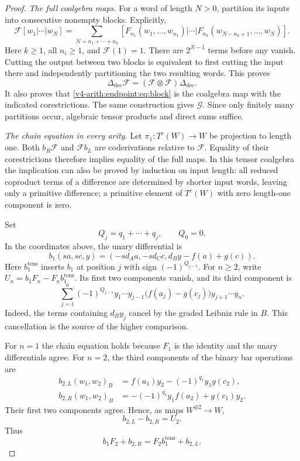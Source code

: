 \begin{proof}
\emph{The full coalgebra maps.}
For a word of length $N>0$, partition its inputs into consecutive nonempty blocks. Explicitly,
\begin{equation}\label{v4-arith:endpoint:eq:block}
 \mathcal{F}[w_1|\cdots|w_N]
 =\sum_{N=n_1+\cdots+n_k}
 [F_{n_1}(w_1,\ldots,w_{n_1})|\cdots|
 F_{n_k}(w_{N-n_k+1},\ldots,w_N)].
\end{equation}
Here $k\geq1$, all $n_i\geq1$, and $\mathcal{F}(1)=1$. There are $2^{N-1}$ terms before any vanish. Cutting the output between two blocks is equivalent to first cutting the input there and independently partitioning the two resulting words. This proves
\[
 \Delta_{\mathrm{dec}}\mathcal{F}=(\mathcal{F}\otimes\mathcal{F})\Delta_{\mathrm{dec}}.
\]
It also proves that \eqref{v4-arith:endpoint:eq:block} is the coalgebra map with the indicated corestrictions. The same construction gives $\mathcal{G}$. Since only finitely many partitions occur, algebraic tensor products and direct sums suffice.

\emph{The chain equation in every arity.}
Let $\pi_1:T^c(W)\to W$ be projection to length one. Both $b_R\mathcal{F}$ and $\mathcal{F} b_L$ are coderivations relative to $\mathcal{F}$. Equality of their corestrictions therefore implies equality of the full maps. In this tensor coalgebra the implication can also be proved by induction on input length: all reduced coproduct terms of a difference are determined by shorter input words, leaving only a primitive difference; a primitive element of $T^c(W)$ with zero length-one component is zero.

Set
\[
 Q_j=q_1+\cdots+q_j,\qquad Q_0=0.
\]
In the coordinates above, the unary differential is
\begin{equation}\label{v4-arith:endpoint:eq:unary}
 b_1(sa,sc,y)=(-s d_Aa,-s d_Cc,d_By-f(a)+g(c)).
\end{equation}
Here $b_1^{\mathrm{tens}}$ inserts $b_1$ at position $j$ with sign
$(-1)^{Q_{j-1}}$. For $n\geq2$, write
$U_n=b_1F_n-F_nb_1^{\mathrm{tens}}$. Its first two components vanish,
and its third component is
\begin{equation}\label{v4-arith:endpoint:eq:unarydefect}
 \sum_{j=1}^n(-1)^{Q_{j-1}}
 y_1\cdots y_{j-1}\bigl(f(a_j)-g(c_j)\bigr)y_{j+1}\cdots y_n.
\end{equation}
Indeed, the terms containing $d_By_j$ cancel by the graded Leibniz rule in $B$. This cancellation is the source of the higher comparison.

For $n=1$ the chain equation holds because $F_1$ is the identity and the unary differentials agree. For $n=2$, the third components of the binary bar operations are
\begin{align*}
 b_{2,L}(w_1,w_2)_B
 &=f(a_1)y_2-(-1)^{q_1}y_1g(c_2),\\
 b_{2,R}(w_1,w_2)_B
 &=-(-1)^{q_1}y_1f(a_2)+g(c_1)y_2.
\end{align*}
Their first two components agree. Hence, as maps $W^{\otimes2}\to W$,
\[
 b_{2,L}-b_{2,R}=U_2.
\]
Thus
\[
 b_1F_2+b_{2,R}=F_2b_1^{\mathrm{tens}}+b_{2,L}.
\]


\end{proof}

